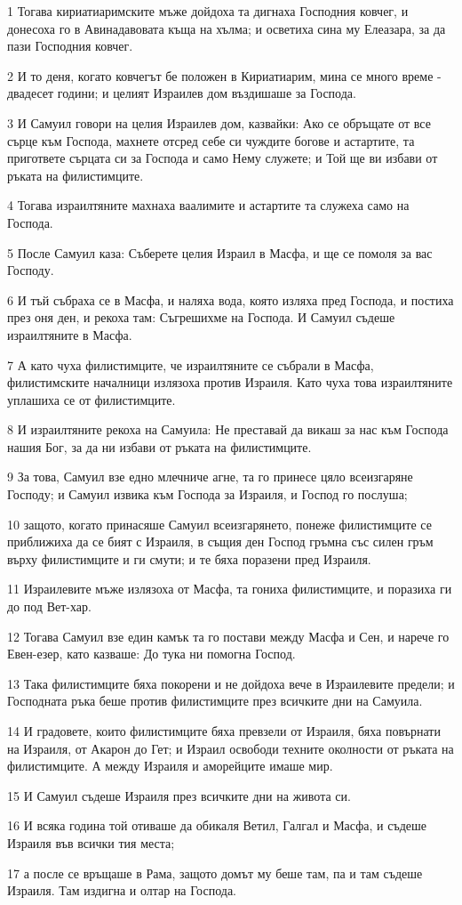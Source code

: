 \par 1 Тогава кириатиаримските мъже дойдоха та дигнаха Господния ковчег, и донесоха го в Авинадавовата къща на хълма; и осветиха сина му Елеазара, за да пази Господния ковчег.
\par 2 И то деня, когато ковчегът бе положен в Кириатиарим, мина се много време - двадесет години; и целият Израилев дом въздишаше за Господа.
\par 3 И Самуил говори на целия Израилев дом, казвайки: Ако се обръщате от все сърце към Господа, махнете отсред себе си чуждите богове и астартите, та пригответе сърцата си за Господа и само Нему служете; и Той ще ви избави от ръката на филистимците.
\par 4 Тогава израилтяните махнаха ваалимите и астартите та служеха само на Господа.
\par 5 После Самуил каза: Съберете целия Израил в Масфа, и ще се помоля за вас Господу.
\par 6 И тъй събраха се в Масфа, и наляха вода, която изляха пред Господа, и постиха през оня ден, и рекоха там: Съгрешихме на Господа. И Самуил съдеше израилтяните в Масфа.
\par 7 А като чуха филистимците, че израилтяните се събрали в Масфа, филистимските началници излязоха против Израиля. Като чуха това израилтяните уплашиха се от филистимците.
\par 8 И израилтяните рекоха на Самуила: Не преставай да викаш за нас към Господа нашия Бог, за да ни избави от ръката на филистимците.
\par 9 За това, Самуил взе едно млечниче агне, та го принесе цяло всеизгаряне Господу; и Самуил извика към Господа за Израиля, и Господ го послуша;
\par 10 защото, когато принасяше Самуил всеизгарянето, понеже филистимците се приближиха да се бият с Израиля, в същия ден Господ гръмна със силен гръм върху филистимците и ги смути; и те бяха поразени пред Израиля.
\par 11 Израилевите мъже излязоха от Масфа, та гониха филистимците, и поразиха ги до под Вет-хар.
\par 12 Тогава Самуил взе един камък та го постави между Масфа и Сен, и нарече го Евен-езер, като казваше: До тука ни помогна Господ.
\par 13 Така филистимците бяха покорени и не дойдоха вече в Израилевите предели; и Господната ръка беше против филистимците през всичките дни на Самуила.
\par 14 И градовете, които филистимците бяха превзели от Израиля, бяха повърнати на Израиля, от Акарон до Гет; и Израил освободи техните околности от ръката на филистимците. А между Израиля и аморейците имаше мир.
\par 15 И Самуил съдеше Израиля през всичките дни на живота си.
\par 16 И всяка година той отиваше да обикаля Ветил, Галгал и Масфа, и съдеше Израиля във всички тия места;
\par 17 а после се връщаше в Рама, защото домът му беше там, па и там съдеше Израиля. Там издигна и олтар на Господа.

